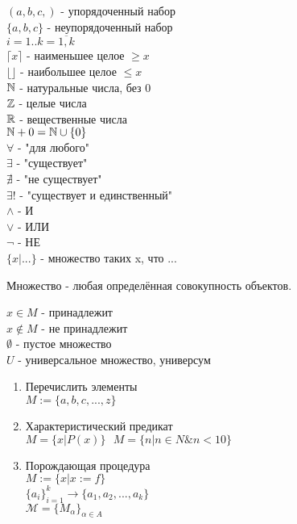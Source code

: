 
\noindent
$ (a, b, c, ) $ - упорядоченный набор \\
$ \{ a, b, c \} $ - неупорядоченный набор \\
$ i = 1 .. k = \overline{1, k} $ \\
$ \lceil x \rceil $ - наименьшее целое $ \geq x $ \\
$ \lfloor \rfloor $ - наибольшее целое $ \leq x $ \\
$ \mathbb{N} $ - натуральные числа, без 0 \\
$ \mathbb{Z} $ - целые числа \\
$ \mathbb{R} $ - вещественные числа \\
$ \mathbb{N} + 0 = \mathbb{N} \cup \{ 0 \}  $ \\
$ \forall $ - "для любого" \\
$ \exists $ - "существует" \\
$ \nexists $ - "не существует" \\
$ \exists ! $ - "существует и единственный" \\
$ \wedge $ - И \\
$ \vee $ - ИЛИ \\
$ \neg $ - НЕ \\
$ \{ x | ... \} $ - множество таких x, что ... \\

\begin{definition}
	Множество - любая определённая совокупность объектов.
\end{definition}
$ x \in M $ - принадлежит\\
$ x \notin M $ - не принадлежит \\
$ \emptyset $ - пустое множество \\
$ U $ - универсальное множество, универсум \\
\begin{enumerate}
	\item Перечислить элементы \\
	$ M := \{ a, b,c, ..., z \} $ 
	\item Характеристический предикат \\
	$ M = \{ x | P(x) \} \ \ \ M = \{ n | n \in N \& n < 10 \} $
	\item Порождающая процедура \\
	$ M := \{x| x := f \} $ \\
	$ \{a_i\}_{i=1}^{k} \rightarrow \{a_1, a_2, ..., a_k \} $ \\
	$ \mathcal{M} = \{M_{\alpha}\}_{\alpha \in A} $ \\
\end{enumerate}

